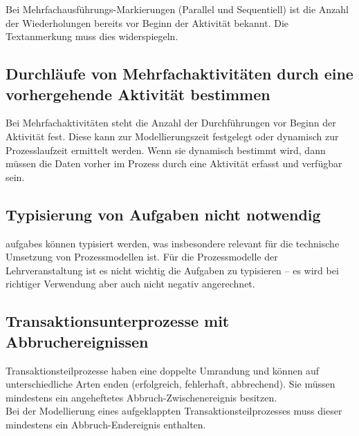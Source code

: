 \documentclass[12pt,report]{../../Templates/snetTeaching}
\begin{document}
Bei Mehrfachausführungs-Markierungen (Parallel und Sequentiell) ist die Anzahl der Wiederholungen bereits vor Beginn der Aktivität bekannt. Die Textanmerkung muss dies widerspiegeln.

\begin{Rahmen}
	\hfill
\end{Rahmen}

\clearpage
\subsection{Durchläufe von Mehrfachaktivitäten durch eine vorhergehende Aktivität bestimmen}

Bei Mehrfachaktivitäten steht die Anzahl der Durchführungen vor Beginn der Aktivität fest. Diese kann zur Modellierungszeit festgelegt oder dynamisch zur Prozesslaufzeit ermittelt werden. Wenn sie dynamisch bestimmt wird, dann müssen die Daten vorher im Prozess durch eine Aktivität erfasst und verfügbar sein.


\begin{Rahmen}
\end{Rahmen}

\subsection{Typisierung von Aufgaben nicht notwendig}

\Glspl{aufgabe} können typisiert werden, was insbesondere relevant für die technische Umsetzung von Prozessmodellen ist. Für die Prozessmodelle der Lehrveranstaltung \lvname{} ist es nicht wichtig die Aufgaben zu typisieren -- es wird bei richtiger Verwendung aber auch nicht negativ angerechnet.

\begin{Rahmen}
	\hfill
\end{Rahmen}

\clearpage

\subsection{Transaktionsunterprozesse mit Abbruchereignissen}

Transaktionsteilprozesse haben eine doppelte Umrandung und können auf unterschiedliche Arten enden (erfolgreich, fehlerhaft, abbrechend). Sie müssen mindestens ein angeheftetes Abbruch-Zwischenereignis besitzen.\\
Bei der Modellierung eines aufgeklappten Transaktionsteilprozesses muss dieser mindestens ein Abbruch-Endereignis enthalten.
\end{document}

